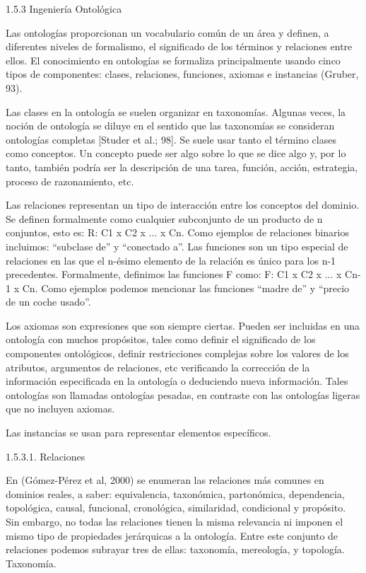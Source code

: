 1.5.3 Ingeniería Ontológica

Las ontologías proporcionan un vocabulario común de un área y definen, a diferentes niveles de formalismo, el significado de los términos y relaciones entre ellos. El conocimiento en ontologías se formaliza principalmente usando cinco tipos de componentes: clases, relaciones, funciones, axiomas e instancias (Gruber, 93).

Las clases en la ontología se suelen organizar en taxonomías. Algunas veces, la noción de ontología se diluye en el sentido que las taxonomías se consideran ontologías completas [Studer et al.; 98]. Se suele usar tanto el término clases como conceptos. Un concepto puede ser algo sobre lo que se dice algo y, por lo tanto, también podría ser la descripción de una tarea, función, acción, estrategia, proceso de razonamiento, etc. 

Las relaciones representan un tipo de interacción entre los conceptos del dominio. Se definen formalmente como cualquier subconjunto de un producto de n conjuntos, esto es: 
R: C1 x C2 x ... x Cn.
Como ejemplos de relaciones binarios incluimos: “subclase de” y “conectado a”. Las funciones son un tipo especial de relaciones en las que el n-ésimo elemento de la relación es único para los n-1 precedentes. Formalmente, definimos las funciones F como: 
F: C1 x C2 x ... x Cn-1 x  Cn. 
Como ejemplos podemos mencionar las funciones “madre de” y “precio de un coche usado”. 

Los axiomas son expresiones que son siempre ciertas. Pueden ser incluidas en una ontología con muchos propósitos, tales como definir el significado de los componentes ontológicos, definir restricciones complejas sobre los valores de los atributos, argumentos de relaciones, etc verificando la corrección de la información especificada en la ontología o deduciendo nueva información. Tales ontologías son llamadas ontologías pesadas, en contraste con las ontologías ligeras que no incluyen axiomas. 

Las instancias se usan para representar elementos específicos.

1.5.3.1. Relaciones

En (Gómez-Pérez et al, 2000) se enumeran las relaciones más comunes en dominios reales, a saber: equivalencia, taxonómica, partonómica, dependencia, topológica, causal, funcional, cronológica, similaridad, condicional y propósito. Sin embargo, no todas las relaciones tienen la misma relevancia ni imponen el mismo tipo de propiedades jerárquicas a la ontología. Entre este conjunto de relaciones podemos subrayar tres de ellas: taxonomía, mereología, y topología. Taxonomía.

